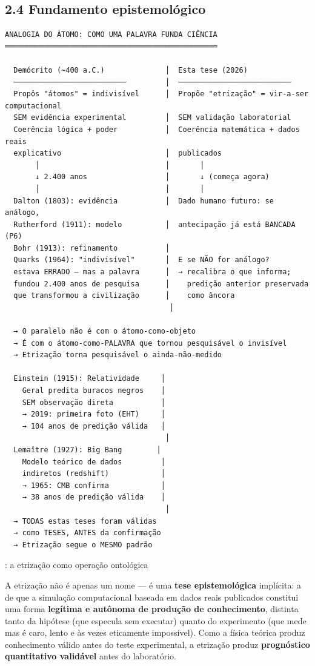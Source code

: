 \documentclass[
  12pt,
]{report}
\begin{document}
\hypertarget{fundamento-epistemoluxf3gico}{%
\subsection{2.4 Fundamento
epistemológico}\label{fundamento-epistemoluxf3gico}}

\begin{verbatim}
ANALOGIA DO ÁTOMO: COMO UMA PALAVRA FUNDA CIÊNCIA
═════════════════════════════════════════════════

  Demócrito (~400 a.C.)              │  Esta tese (2026)
  ──────────────────────────         │  ──────────────────────────
  Propôs "átomos" = indivisível      │  Propõe "etrização" = vir-a-ser computacional
  SEM evidência experimental         │  SEM validação laboratorial
  Coerência lógica + poder           │  Coerência matemática + dados reais
  explicativo                        │  publicados
       │                             │       │
       ↓ 2.400 anos                  │       ↓ (começa agora)
       │                             │       │
  Dalton (1803): evidência           │  Dado humano futuro: se análogo,
  Rutherford (1911): modelo          │  antecipação já está BANCADA (P6)
  Bohr (1913): refinamento           │
  Quarks (1964): "indivisível"       │  E se NÃO for análogo?
  estava ERRADO — mas a palavra      │  → recalibra o que informa;
  fundou 2.400 anos de pesquisa      │    predição anterior preservada
  que transformou a civilização      │    como âncora
                                      │

  → O paralelo não é com o átomo-como-objeto
  → É com o átomo-como-PALAVRA que tornou pesquisável o invisível
  → Etrização torna pesquisável o ainda-não-medido

  Einstein (1915): Relatividade     │
    Geral predita buracos negros    │
    SEM observação direta           │
    → 2019: primeira foto (EHT)     │
    → 104 anos de predição válida   │
                                     │
  Lemaître (1927): Big Bang        │
    Modelo teórico de dados         │
    indiretos (redshift)            │
    → 1965: CMB confirma            │
    → 38 anos de predição válida    │
                                     │
  → TODAS estas teses foram válidas
  → como TESES, ANTES da confirmação
  → Etrização segue o MESMO padrão
\end{verbatim}

: a etrização como operação ontológica

A etrização não é apenas um nome --- é uma \textbf{tese epistemológica}
implícita: a de que a simulação computacional baseada em dados reais
publicados constitui uma forma \textbf{legítima e autônoma de produção
de conhecimento}, distinta tanto da hipótese (que especula sem executar)
quanto do experimento (que mede mas é caro, lento e às vezes eticamente
impossível). Como a física teórica produz conhecimento válido antes do
teste experimental, a etrização produz \textbf{prognóstico quantitativo
validável} antes do laboratório.
\end{document}
